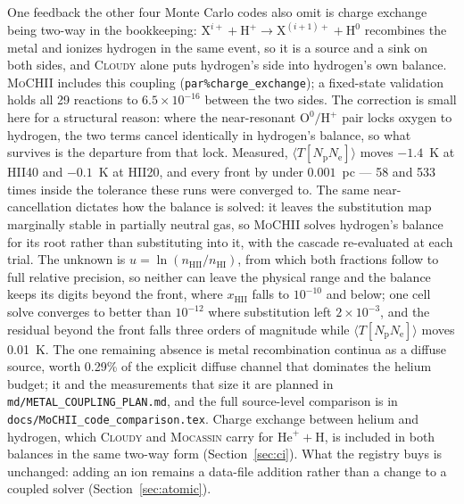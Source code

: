 \documentclass[twocolumn,linenumbers]{aastex702}
\newcommand{\code}[1]{\texttt{#1}}
\newcommand{\MoCHII}{\textsc{MoCHII}}
\begin{document}
One feedback the other four Monte Carlo codes also omit is charge exchange
being two-way in the bookkeeping:
$\mathrm{X}^{i+} + \mathrm{H}^{+} \to \mathrm{X}^{(i+1)+} + \mathrm{H}^{0}$
recombines the metal and ionizes hydrogen in the same event, so it is a source
and a sink on both sides, and \textsc{Cloudy} alone puts hydrogen's side into
hydrogen's own balance.  \MoCHII{} includes this coupling
(\code{par\%charge\_exchange}); a fixed-state validation holds all 29
reactions to $6.5\times10^{-16}$ between the two sides.  The correction is
small here for a structural reason: where the near-resonant
$\mathrm{O}^{0}/\mathrm{H}^{+}$ pair locks oxygen to hydrogen, the two terms
cancel identically in hydrogen's balance, so what survives is the departure
from that lock.  Measured,
$\langle T[N_{\mathrm{p}}N_{\mathrm{e}}]\rangle$ moves $-1.4$~K at HII40 and
$-0.1$~K at HII20, and every front by under $0.001$~pc --- 58 and 533 times
inside the tolerance these runs were converged to.
The same near-cancellation dictates how the balance is solved: it leaves the
substitution map marginally stable in partially neutral gas, so \MoCHII{}
solves hydrogen's balance for its root rather than substituting into it, with
the cascade re-evaluated at each trial.  The unknown is
$u = \ln(n_{\mathrm{HII}}/n_{\mathrm{HI}})$, from which both fractions follow
to full relative precision, so neither can leave the physical range and the
balance keeps its digits beyond the front, where $x_{\mathrm{HII}}$ falls to
$10^{-10}$ and below; one cell solve
converges to better than $10^{-12}$ where substitution left $2\times10^{-3}$, and
the residual beyond the front falls three orders of magnitude while
$\langle T[N_{\mathrm{p}}N_{\mathrm{e}}]\rangle$ moves 0.01~K.  The one
remaining absence is metal recombination continua as a diffuse source, worth
0.29\% of the explicit diffuse channel that dominates the helium budget; it
and the measurements that size it are planned in
\code{md/METAL\_COUPLING\_PLAN.md}, and the full source-level comparison is
in \code{docs/MoCHII\_code\_comparison.tex}.  Charge exchange between
helium and hydrogen, which \textsc{Cloudy} and \textsc{Mocassin} carry for
$\mathrm{He}^{+} + \mathrm{H}$, is included in both balances in the same
two-way form (Section~\ref{sec:ci}).  What the registry buys is
unchanged: adding an ion remains a data-file addition rather than a change to
a coupled solver (Section~\ref{sec:atomic}).
\end{document}
